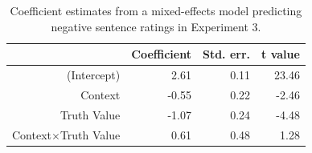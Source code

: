 \documentclass[man, noapacite]{apa2}
\begin{document}
\begin{table}[t]
\caption{\label{tab:s3.1} Coefficient estimates from a mixed-effects model predicting negative sentence ratings in Experiment 3.}
\begin{center}
\small\addtolength{\tabcolsep}{-5pt}
\begin{tabular}{rrrr}
 \hline
 & Coefficient & Std. err. & t value \\
 \hline
(Intercept) & 2.61 & 0.11 & 23.46 \\
 Context & -0.55 & 0.22 & -2.46 \\
 Truth Value & -1.07 & 0.24 & -4.48 \\
 Context$\times$Truth Value & 0.61 & 0.48 & 1.28 \\
  \hline
\end{tabular}
\end{center}
\end{table}


\end{document}
